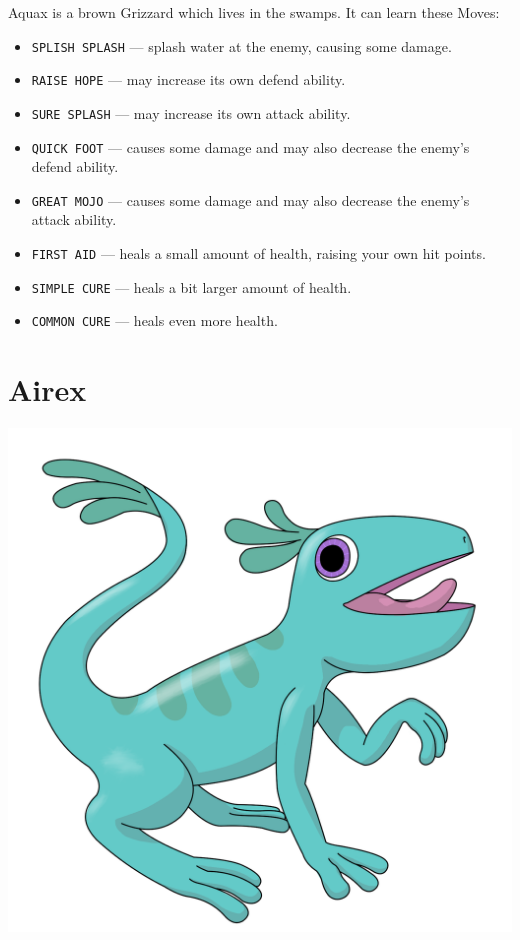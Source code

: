 \documentclass[10pt,twocolumn,openany,article]{memoir}
\begin{document}
\begin{description}
Aquax is a brown Grizzard which lives  in the swamps. It can learn these
Moves:

\begin{itemize}
\item  \texttt{SPLISH SPLASH}  --- splash  water at  the enemy,  causing
  some damage. 
\item \texttt{RAISE HOPE} --- may increase its own defend ability.
\item \texttt{SURE SPLASH} --- may increase its own attack ability.
\item \texttt{QUICK FOOT}  --- causes some damage and  may also decrease
  the enemy's defend ability.
\item \texttt{GREAT MOJO}  --- causes some damage and  may also decrease
  the enemy's attack ability.
\item \texttt{FIRST  AID} ---  heals a small  amount of  health, raising
  your own hit points.
\item \texttt{SIMPLE CURE} --- heals a bit larger amount of health.
\item \texttt{COMMON CURE} --- heals even more health.
\end{itemize}

\ifdefined\DEMO\else

\section{Airex}

\includegraphics[width=\columnwidth]{../Manual/Airex.png}


\end{description}
\end{document}
